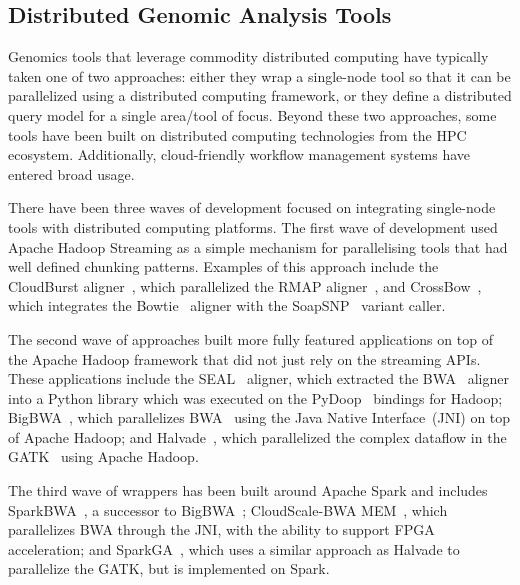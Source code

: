 \documentclass[phd]{ucbthesis}
\begin{document}
\subsection{Distributed Genomic Analysis Tools}
\label{sec:distributed-genome-analysis}

Genomics tools that leverage commodity distributed computing have typically
taken one of two approaches: either they wrap a single-node tool so that it can
be parallelized using a distributed computing framework, or they define a
distributed query model for a single area/tool of focus. Beyond these two
approaches, some tools have been built on distributed computing technologies
from the HPC ecosystem. Additionally, cloud-friendly workflow management
systems have entered broad usage.

There have been three waves of development focused on integrating single-node
tools with distributed computing platforms. The first wave of development used
{Apache Hadoop Streaming} as a simple mechanism for parallelising tools
that had well defined chunking patterns. Examples of this approach include the
{CloudBurst} aligner~\cite{schatz09}, which parallelized the
{RMAP} aligner~\cite{smith08}, and
{CrossBow}~\cite{langmead09crossbow}, which integrates the
{Bowtie}~\cite{langmead09bowtie} aligner with the
{SoapSNP}~\cite{li09snp} variant caller.

The second wave of approaches
built more fully featured applications on top of the {Apache Hadoop}
framework that did not just rely on the streaming APIs. These applications
include the {SEAL}~\cite{pireddu11} aligner, which extracted the
{BWA}~\cite{li09} aligner into a Python library which was executed
on the {PyDoop}~\cite{leo10} bindings for {Hadoop};
{BigBWA}~\cite{abuin15}, which parallelizes {BWA}~\cite{li09}
using the Java Native Interface~(JNI) on top of {Apache Hadoop}; and
{Halvade}~\cite{decap15}, which parallelized the complex dataflow in
the {GATK}~\cite{depristo11} using {Apache Hadoop}.

The third
wave of wrappers has been built around {Apache Spark} and includes \linebreak
{SparkBWA}~\cite{abuin16}, a successor to {BigBWA}~\cite{abuin15};
{CloudScale-BWA MEM}~\cite{chen16}, which parallelizes
{BWA} through the JNI, with the ability to support {FPGA}
acceleration; and {SparkGA}~\cite{mushtaq17}, which uses a similar
approach as {Halvade} to parallelize the {GATK}, but is
implemented on {Spark}.
\end{document}
